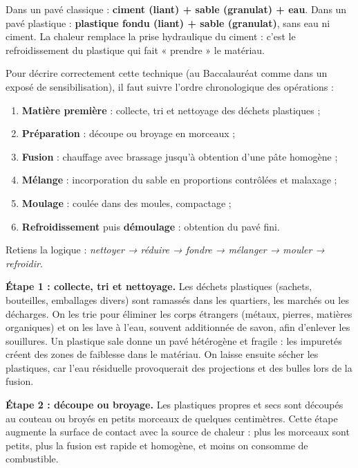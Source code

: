\documentclass[11pt]{article}
\newcounter{popsec}
\newcounter{popsub}
\newcommand{\courssub}[1]{%
  \stepcounter{popsub}%
  \par\vspace{9pt}\noindent{\popxbold\fontsize{11.5}{13}\selectfont\color{popink}{\color{poporange}\thepopsec.\thepopsub}\hspace{6pt}#1}\par\nopagebreak\vspace{4pt}
}
\begin{document}
\begin{aretenir}
Dans un pavé classique : \textbf{ciment (liant) + sable (granulat) + eau}. Dans un pavé plastique : \textbf{plastique fondu (liant) + sable (granulat)}, sans eau ni ciment. La chaleur remplace la prise hydraulique du ciment : c'est le refroidissement du plastique qui fait « prendre » le matériau.
\end{aretenir}

\courssub{Les étapes de la fabrication}

\begin{methode}
Pour décrire correctement cette technique (au Baccalauréat comme dans un exposé de sensibilisation), il faut suivre l'ordre chronologique des opérations :
\begin{enumerate}
\item \textbf{Matière première} : collecte, tri et nettoyage des déchets plastiques ;
\item \textbf{Préparation} : découpe ou broyage en morceaux ;
\item \textbf{Fusion} : chauffage avec brassage jusqu'à obtention d'une pâte homogène ;
\item \textbf{Mélange} : incorporation du sable en proportions contrôlées et malaxage ;
\item \textbf{Moulage} : coulée dans des moules, compactage ;
\item \textbf{Refroidissement} puis \textbf{démoulage} : obtention du pavé fini.
\end{enumerate}
Retiens la logique : \emph{nettoyer → réduire → fondre → mélanger → mouler → refroidir}.
\end{methode}

\textbf{Étape 1 : collecte, tri et nettoyage.} Les déchets plastiques (sachets, bouteilles, emballages divers) sont ramassés dans les quartiers, les marchés ou les décharges. On les trie pour éliminer les corps étrangers (métaux, pierres, matières organiques) et on les lave à l'eau, souvent additionnée de savon, afin d'enlever les souillures. Un plastique sale donne un pavé hétérogène et fragile : les impuretés créent des zones de faiblesse dans le matériau. On laisse ensuite sécher les plastiques, car l'eau résiduelle provoquerait des projections et des bulles lors de la fusion.

\textbf{Étape 2 : découpe ou broyage.} Les plastiques propres et secs sont découpés au couteau ou broyés en petits morceaux de quelques centimètres. Cette étape augmente la surface de contact avec la source de chaleur : plus les morceaux sont petits, plus la fusion est rapide et homogène, et moins on consomme de combustible.
\end{document}
